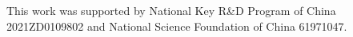 \documentclass[sigconf]{acmart}
\begin{document}
 





\begin{acks}
This work was supported by National Key R\&D Program of China 2021ZD0109802 and National Science Foundation of China 61971047.
\end{acks}





\end{document}
